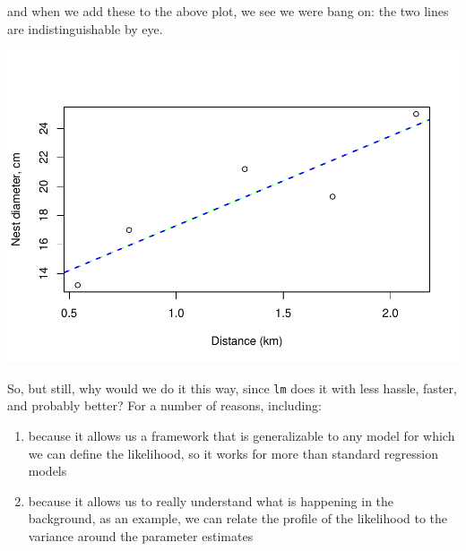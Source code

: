 \documentclass[
]{book}
\newenvironment{Shaded}{\begin{snugshade}}{\end{snugshade}}
\newcommand{\DataTypeTok}[1]{\textcolor[rgb]{0.13,0.29,0.53}{#1}}
\newcommand{\DecValTok}[1]{\textcolor[rgb]{0.00,0.00,0.81}{#1}}
\newcommand{\KeywordTok}[1]{\textcolor[rgb]{0.13,0.29,0.53}{\textbf{#1}}}
\newcommand{\NormalTok}[1]{#1}
\newcommand{\OperatorTok}[1]{\textcolor[rgb]{0.81,0.36,0.00}{\textbf{#1}}}
\newcommand{\StringTok}[1]{\textcolor[rgb]{0.31,0.60,0.02}{#1}}
\providecommand{\tightlist}{%
  \setlength{\itemsep}{0pt}\setlength{\parskip}{0pt}}
\begin{document}
and when we add these to the above plot, we see we were bang on: the two lines are indistinguishable by eye.

\begin{Shaded}
\end{Shaded}

\includegraphics{ECOMODbook_files/figure-latex/ch13.30.5-1.pdf}

So, but still, why would we do it this way, since \texttt{lm} does it with less hassle, faster, and probably better? For a number of reasons, including:

\begin{enumerate}
\def\labelenumi{\arabic{enumi}.}
\tightlist
\item
  because it allows us a framework that is generalizable to any model for which we can define the likelihood, so it works for more than standard regression models
\item
  because it allows us to really understand what is happening in the background, as an example, we can relate the profile of the likelihood to the variance around the parameter estimates
\end{enumerate}
\end{document}
